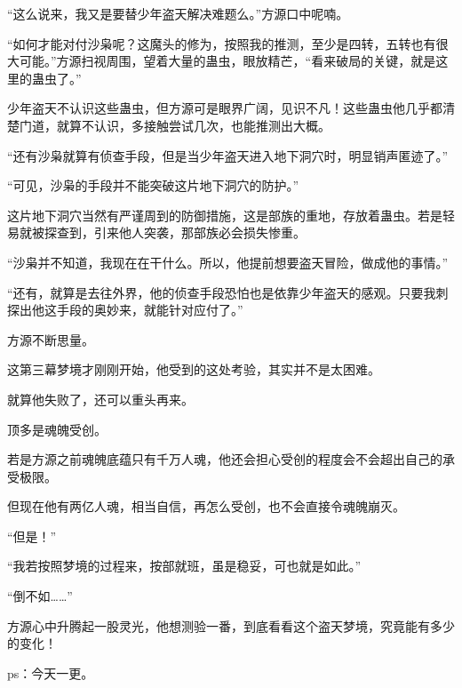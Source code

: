 \begin{this_body}
“这么说来，我又是要替少年盗天解决难题么。”方源口中呢喃。

“如何才能对付沙枭呢？这魔头的修为，按照我的推测，至少是四转，五转也有很大可能。”方源扫视周围，望着大量的蛊虫，眼放精芒，“看来破局的关键，就是这里的蛊虫了。”

少年盗天不认识这些蛊虫，但方源可是眼界广阔，见识不凡！这些蛊虫他几乎都清楚门道，就算不认识，多接触尝试几次，也能推测出大概。

“还有沙枭就算有侦查手段，但是当少年盗天进入地下洞穴时，明显销声匿迹了。”

“可见，沙枭的手段并不能突破这片地下洞穴的防护。”

这片地下洞穴当然有严谨周到的防御措施，这是部族的重地，存放着蛊虫。若是轻易就被探查到，引来他人突袭，那部族必会损失惨重。

“沙枭并不知道，我现在在干什么。所以，他提前想要盗天冒险，做成他的事情。”

“还有，就算是去往外界，他的侦查手段恐怕也是依靠少年盗天的感观。只要我刺探出他这手段的奥妙来，就能针对应付了。”

方源不断思量。

这第三幕梦境才刚刚开始，他受到的这处考验，其实并不是太困难。

就算他失败了，还可以重头再来。

顶多是魂魄受创。

若是方源之前魂魄底蕴只有千万人魂，他还会担心受创的程度会不会超出自己的承受极限。

但现在他有两亿人魂，相当自信，再怎么受创，也不会直接令魂魄崩灭。

“但是！”

“我若按照梦境的过程来，按部就班，虽是稳妥，可也就是如此。”

“倒不如……”

方源心中升腾起一股灵光，他想测验一番，到底看看这个盗天梦境，究竟能有多少的变化！

ps：今天一更。

\end{this_body}

